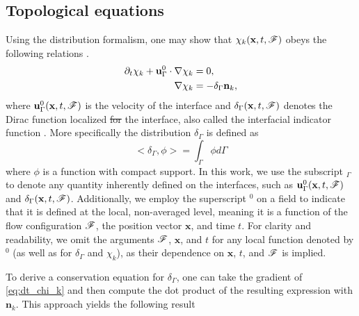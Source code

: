 \documentclass[11pt]{My_preprint}
\providecommand{\DIFadd}[1]{{\protect\color{blue}\uwave{#1}}} %
\providecommand{\DIFdel}[1]{{\protect\color{red}\sout{#1}}}                      %
\providecommand{\DIFaddbegin}{} %
\providecommand{\DIFaddend}{} %
\providecommand{\DIFdelbegin}{} %
\providecommand{\DIFdelend}{} %
\begin{document}
\subsection{Topological equations}
Using the distribution formalism, one may show that $\chi_k(\textbf{x},t,\mathscr{F})$ obeys the following relations \citep{drew1983mathematical}. 
\begin{align}
    \pddt \chi_k
    + \textbf{u}_\Gamma^0 \cdot \grad \chi_k
    &= 0,
    \label{eq:dt_chi_k}\\
    \label{eq:grad_chi_k}
    \grad \chi_k
    &= - \delta_\Gamma \textbf{n}_k, 
\end{align}
where $\textbf{u}^0_\Gamma(\textbf{x},t,\mathscr{F})$ is the velocity of the interface and $\delta_\Gamma(\textbf{x},t,\mathscr{F})$ denotes the Dirac function localized \DIFdelbegin \DIFdel{for }\DIFdelend \DIFaddbegin \DIFadd{on }\DIFaddend the interface, also called the interfacial indicator function \citep{drew1983mathematical,junqua2003}. 
More specifically the distribution $\delta_\Gamma$ is defined as \citep{appel2007}
\begin{equation}
<\delta_\Gamma,\phi> =\int_{\Gamma} \phi d\Gamma 
\DIFaddbegin \label{eq:def_surf_distribution}
\DIFaddend \end{equation}  
where $\phi$ is a function with compact support. In this work, we use the subscript $_\Gamma$ to denote any quantity inherently defined on the interfaces, such as $\textbf{u}_\Gamma^0(\textbf{x}, t, \mathscr{F})$ and $\delta_\Gamma(\textbf{x}, t, \mathscr{F})$. Additionally, we employ the superscript $^0$ on a field to indicate that it is defined at the local, non-averaged level, meaning it is a function of the flow configuration $\mathscr{F}$, the position vector $\textbf{x}$, and time $t$. For clarity and readability, we omit the arguments $\mathscr{F}$, $\textbf{x}$, and $t$ for any local function denoted by $^0$ (as well as for $\delta_\Gamma$ and $\chi_k$), as their dependence on $\textbf{x}$, $t$, and $\mathscr{F}$ is implied.


To derive a conservation equation for $\delta_\Gamma$, one can take the gradient of \ref{eq:dt_chi_k} and then compute the dot product of the resulting expression with $\textbf{n}_k$. This approach yields the following result \citep{marle1982macroscopic,drew1990,lhuillier2000bilan,junqua2003}
\end{document}
